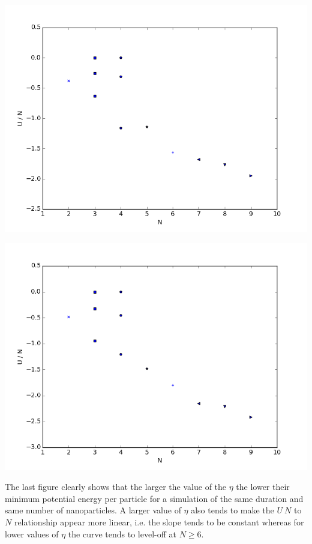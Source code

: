 \documentclass{article}
\begin{document}
{\centering
    \includegraphics[width=\linewidth]{bonus_eta00100}
    }

{\centering
    \includegraphics[width=\linewidth]{bonus_eta10000}
    }

The last figure clearly shows that the larger the value of the $\eta$ the lower their minimum potential energy per particle for a simulation of the same duration and same number of nanoparticles.
A larger value of $\eta$ also tends to make the $U \ N$ to $N$ relationship appear more linear, i.e. the slope tends to be constant whereas for lower values of $\eta$ the curve tends to level-off at $N \ge 6$.
\end{document}
